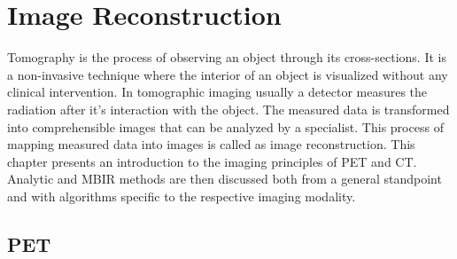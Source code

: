 
\chapter{Image Reconstruction} %

\label{Chapter1} %

Tomography is the process of observing an object through its cross-sections. It is a non-invasive technique where the interior of an object is visualized without any clinical intervention. In tomographic imaging usually a detector measures the radiation after it's interaction with the object. The measured data is transformed into comprehensible images that can be analyzed by a specialist. This process of mapping measured data into images is called as image reconstruction. This chapter presents an introduction to the imaging principles of \ac{PET} and \ac{CT}. Analytic and \ac{MBIR} methods are then discussed both from a general standpoint and with algorithms specific to the respective imaging modality.  
\section{PET}

